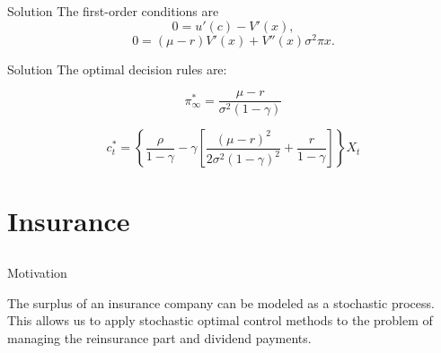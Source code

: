\documentclass{beamer}
\theoremstyle{definition}
\begin{document}
\begin{frame}{Solution}
    The first-order conditions are
    \begin{equation}
    0=u'(c)-V'(x),
    \end{equation}
    \begin{equation}
    0=(\mu-r)V'(x)+V''(x)\sigma^2\pi x.
    \end{equation}
\end{frame}

\begin{frame}{Solution}
    The optimal decision rules are:
    
    \begin{equation}
    \boxed{\ \pi_\infty^*=\frac{\mu-r}{\sigma^2(1-\gamma)}\ }
    \end{equation}
    
    \begin{equation}
    \boxed{\ c_t^*=
    \left\{
    \frac{\rho}{1-\gamma}
    -\gamma\left[
    \frac{(\mu-r)^2}{2\sigma^2(1-\gamma)^2}
    +\frac{r}{1-\gamma}
    \right]
    \right\}X_t\ }
    \end{equation}
\end{frame}



\section{Insurance}
\subsection{}

\begin{frame}{Motivation}

The surplus of an insurance company can be modeled as a stochastic process.
This allows us to apply stochastic optimal control methods to the problem of managing the reinsurance part and dividend payments.

\end{frame}
\end{document}
